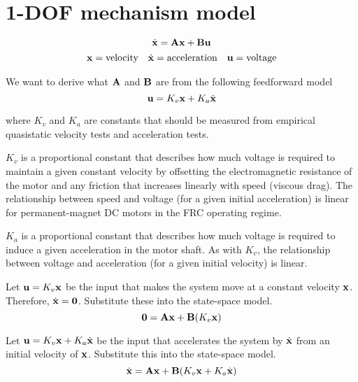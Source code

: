 \section{1-DOF mechanism model}
\begin{equation*}
  \dot{\mathbf{x}} = \mathbf{A}\mathbf{x} + \mathbf{B}\mathbf{u}
\end{equation*}
\begin{equation*}
  \begin{array}{ccc}
    \mathbf{x} = \text{velocity} & \dot{\mathbf{x}} = \text{acceleration} &
      \mathbf{u} = \text{voltage}
  \end{array}
\end{equation*}

We want to derive what $\mathbf{A}$ and $\mathbf{B}$ are from the following
feedforward model
\begin{equation*}
  \mathbf{u} = K_v \mathbf{x} + K_a \dot{\mathbf{x}}
\end{equation*}

where $K_v$ and $K_a$ are constants that should be measured from empirical
quasistatic velocity tests and acceleration tests.

$K_v$ is a proportional constant that describes how much voltage is required to
maintain a given constant velocity by offsetting the electromagnetic resistance
of the motor and any friction that increases linearly with speed (viscous drag).
The relationship between speed and voltage (for a given initial acceleration) is
linear for permanent-magnet DC motors in the FRC operating regime.

$K_a$ is a proportional constant that describes how much voltage is required to
induce a given acceleration in the motor shaft. As with $K_v$, the relationship
between voltage and acceleration (for a given initial velocity) is linear.

Let $\mathbf{u} = K_v \mathbf{x}$ be the input that makes the system move at a
constant velocity $\mathbf{x}$. Therefore, $\dot{\mathbf{x}} = \mathbf{0}$. Substitute
these into the state-space model.
\begin{equation}
  \mathbf{0} = \mathbf{A}\mathbf{x} + \mathbf{B}(K_v \mathbf{x}) \label{eq:sysid-eq1}
\end{equation}

Let $\mathbf{u} = K_v \mathbf{x} + K_a \dot{\mathbf{x}}$ be the input that accelerates
the system by $\dot{\mathbf{x}}$ from an initial velocity of $\mathbf{x}$. Substitute
this into the state-space model.
\begin{equation}
  \dot{\mathbf{x}} = \mathbf{A}\mathbf{x} + \mathbf{B}(K_v \mathbf{x} + K_a \dot{\mathbf{x}})
    \label{eq:sysid-eq2}
\end{equation}

